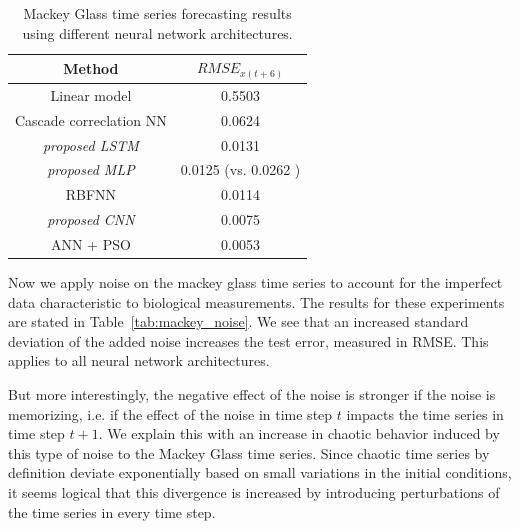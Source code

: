 \documentclass{article}
\begin{document}
\begin{table}
  \centering
  \begin{tabular}{c|c}
    Method                         & $RMSE_{x(t+6)}$                          \\
    \hline
    Linear model                   & 0.5503                                   \\
    Cascade correclation NN        & 0.0624                                   \\
    \textit{proposed LSTM}         & 0.0131                                   \\
    \textit{proposed MLP}          & 0.0125 (vs. 0.0262 \cite{caraballo2016}) \\
    RBFNN                          & 0.0114                                   \\
    \textit{proposed CNN}          & 0.0075                                   \\
    ANN + PSO \cite{caraballo2016} & 0.0053                                   \\
  \end{tabular}
  \caption{Mackey Glass time series forecasting results using different neural
    network architectures.}
  \label{tab:mackey_results}
\end{table}

Now we apply noise on the mackey glass time series to account for the imperfect
data characteristic to biological measurements. The results for these 
experiments are stated in Table~\ref{tab:mackey_noise}. We see that an increased
standard deviation of the added noise increases the test error, measured in 
RMSE. This applies to all neural network architectures. 

But more interestingly,
the negative effect of the noise is stronger if the noise is memorizing, i.e. if
the effect of the noise in time step $t$ impacts the time series in time step 
$t + 1$. We explain this with an increase in chaotic behavior induced by this
type of noise to the Mackey Glass time series. Since chaotic time series by 
definition deviate exponentially based on small variations in the initial
conditions, it seems logical that this divergence is increased by introducing
perturbations of the time series in every time step.
\end{document}
